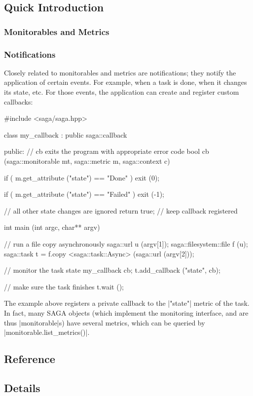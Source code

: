 
 \subsection{Quick Introduction}

  \subsubsection*{Monitorables and Metrics}



  \subsubsection*{Notifications}

  Closely related to monitorables and metrics are notifications; they
  notify the application of certain events. For example, when a task
  is done, when it changes its state, etc.  For those events, the
  application can create and register custom callbacks:


  \begin{mycode}[label=Notifications on task state changes]
  #include <saga/saga.hpp>

  class my_callback : public saga::callback
  {
    public:
      // cb exits the program with appropriate error code
      bool cb (saga::monitorable mt,
               saga::metric      m,
               saga::context     c)
      {
        if ( m.get_attribute ("state") == "Done" ) {
          exit (0);
        }

        if ( m.get_attribute ("state") == "Failed" ) {
          exit (-1);
        }

        // all other state changes are ignored
        return true; // keep callback registered
      }
  }

  int main (int argc, char** argv)
  {
    // run a file copy asynchronously
    saga::url u (argv[1]);
    saga::filesystem::file f (u);
    saga::task t = f.copy <saga::task::Async> (saga::url (argv[2]));

    // monitor the task state
    my_callback cb;
    t.add_callback ("state", cb);

    // make sure the task finishes
    t.wait ();
  }
  \end{mycode}

  The example above registers a private callback to the |"state"|
  metric of the task.  In fact, many SAGA objects (which implement the
  monitoring interface, and are thus |monitorable|s) have several
  metrics, which can be queried by |monitorable.list_metrics()|.



 \subsection{Reference}


 \subsection{Details}


